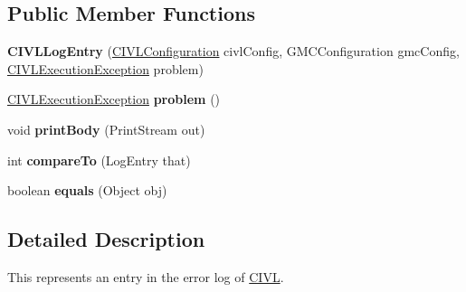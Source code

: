 \subsection*{Public Member Functions}
\begin{DoxyCompactItemize}
\item 
\hypertarget{classedu_1_1udel_1_1cis_1_1vsl_1_1civl_1_1log_1_1IF_1_1CIVLLogEntry_a0a0c22e06c9c3f27f6fcba9568cd4ded}{}{\bfseries C\+I\+V\+L\+Log\+Entry} (\hyperlink{classedu_1_1udel_1_1cis_1_1vsl_1_1civl_1_1config_1_1IF_1_1CIVLConfiguration}{C\+I\+V\+L\+Configuration} civl\+Config, G\+M\+C\+Configuration gmc\+Config, \hyperlink{classedu_1_1udel_1_1cis_1_1vsl_1_1civl_1_1log_1_1IF_1_1CIVLExecutionException}{C\+I\+V\+L\+Execution\+Exception} problem)\label{classedu_1_1udel_1_1cis_1_1vsl_1_1civl_1_1log_1_1IF_1_1CIVLLogEntry_a0a0c22e06c9c3f27f6fcba9568cd4ded}

\item 
\hypertarget{classedu_1_1udel_1_1cis_1_1vsl_1_1civl_1_1log_1_1IF_1_1CIVLLogEntry_a6fc09b710cd7174c5707a016fe52b8de}{}\hyperlink{classedu_1_1udel_1_1cis_1_1vsl_1_1civl_1_1log_1_1IF_1_1CIVLExecutionException}{C\+I\+V\+L\+Execution\+Exception} {\bfseries problem} ()\label{classedu_1_1udel_1_1cis_1_1vsl_1_1civl_1_1log_1_1IF_1_1CIVLLogEntry_a6fc09b710cd7174c5707a016fe52b8de}

\item 
\hypertarget{classedu_1_1udel_1_1cis_1_1vsl_1_1civl_1_1log_1_1IF_1_1CIVLLogEntry_ad569a89440e6e54b2f2292ea7d528684}{}void {\bfseries print\+Body} (Print\+Stream out)\label{classedu_1_1udel_1_1cis_1_1vsl_1_1civl_1_1log_1_1IF_1_1CIVLLogEntry_ad569a89440e6e54b2f2292ea7d528684}

\item 
\hypertarget{classedu_1_1udel_1_1cis_1_1vsl_1_1civl_1_1log_1_1IF_1_1CIVLLogEntry_a7923c5aa136cd308b7f009e9be1bf945}{}int {\bfseries compare\+To} (Log\+Entry that)\label{classedu_1_1udel_1_1cis_1_1vsl_1_1civl_1_1log_1_1IF_1_1CIVLLogEntry_a7923c5aa136cd308b7f009e9be1bf945}

\item 
\hypertarget{classedu_1_1udel_1_1cis_1_1vsl_1_1civl_1_1log_1_1IF_1_1CIVLLogEntry_a396318c0d1c10c1a12cd9f563c69a10a}{}boolean {\bfseries equals} (Object obj)\label{classedu_1_1udel_1_1cis_1_1vsl_1_1civl_1_1log_1_1IF_1_1CIVLLogEntry_a396318c0d1c10c1a12cd9f563c69a10a}

\end{DoxyCompactItemize}


\subsection{Detailed Description}
This represents an entry in the error log of \hyperlink{classedu_1_1udel_1_1cis_1_1vsl_1_1civl_1_1CIVL}{C\+I\+V\+L}. 


